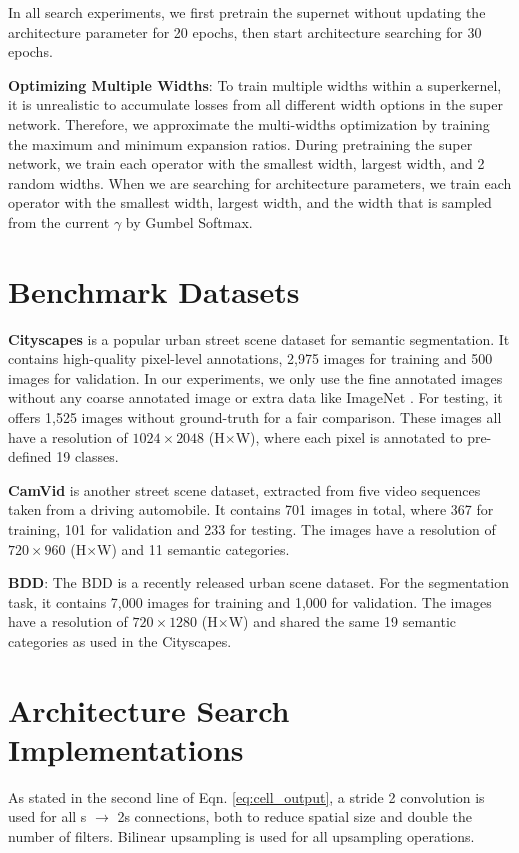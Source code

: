 \documentclass{article} \usepackage{iclr2020_conference,times}
\begin{document}
In all search experiments, we first pretrain the supernet without updating the architecture parameter for 20 epochs, then start architecture searching for 30 epochs.


\textbf{Optimizing Multiple Widths}: To train multiple widths within a superkernel, it is unrealistic to accumulate losses from all different width options in the super network. Therefore, we approximate the multi-widths optimization by training the maximum and minimum expansion ratios. During pretraining the super network, we train each operator with the smallest width, largest width, and 2 random widths. When we are searching for architecture parameters, we train each operator with the smallest width, largest width, and the width that is sampled from the current $\gamma$ by Gumbel Softmax.


\section{Benchmark Datasets}\vspace{-0.7em} \label{app:datasets}
\textbf{Cityscapes} \citep{cordts2016cityscapes} is a popular urban street scene dataset for semantic segmentation. It contains high-quality pixel-level annotations, 2,975 images for training and 500 images for validation. In our experiments, we only use the fine annotated images without any coarse annotated image or extra data like ImageNet \citep{deng2009imagenet}. For testing, it offers 1,525 images without ground-truth for a fair comparison. These images all have a resolution of $1024\times2048$ (H$\times$W), where each pixel is annotated to pre-defined 19 classes.
    
\textbf{CamVid} \citep{brostow2008segmentation} is another street scene dataset, extracted from five video sequences taken from a driving automobile. It contains 701 images in total, where 367 for training, 101 for validation and 233 for testing. The images have a resolution of $720\times960$ (H$\times$W) and 11 semantic categories.

\textbf{BDD}: The BDD \citep{yu2018bdd100k} is a recently released urban scene dataset. For the segmentation task, it contains 7,000 images for training and 1,000 for validation. The images have a resolution of $720\times1280$ (H$\times$W) and shared the same 19 semantic categories as used in the Cityscapes.


\section{Architecture Search Implementations}\vspace{-0.7em} \label{app:implementations}
As stated in the second line of Eqn. \ref{eq:cell_output}, a stride 2 convolution is used for all s $\rightarrow$ 2s connections, both to reduce spatial size and double the number of filters. Bilinear upsampling is used for all upsampling operations.
\end{document}
